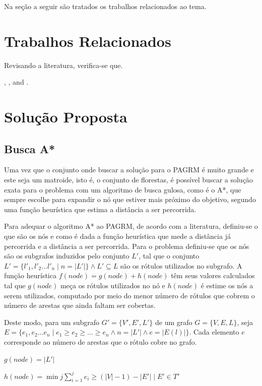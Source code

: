 \documentclass[12pt]{article}
\begin{document}
	Na seção a seguir são tratados os trabalhos relacionados ao tema.

\section{Trabalhos Relacionados}\label{sec:trabalhosRelacionados}

	Revisando a literatura, verifica-se que.

	\cite{knuth:84}, \cite{boulic:91}, and \cite{smith:99}.

\section{Solução Proposta}\label{sec:solucao}

	\subsection{Busca A*}\label{sec:aestrela}

		Uma vez que o conjunto onde buscar a solução para o PAGRM é muito grande e este seja um matroide, isto é, o conjunto de florestas, é possível buscar a solução exata para o problema com um algoritmo de busca gulosa, como é o A*, que sempre escolhe para expandir o nó que estiver mais próximo do objetivo, segundo uma função heurística que estima a distância a ser percorrida.

		Para adequar o algoritmo A* ao PAGRM, de acordo com a literatura, definiu-se o que são os nós e como é dada a função heurística que mede a distância já percorrida e a distância a ser percorrida. Para o problema definiu-se que os nós são os subgrafos induzidos pelo conjunto $L'$, tal que o conjunto $L' = \{l'_1, l'_2 \dots l'_n \mid n = |L'|\} \wedge L' \subseteq L$ são os rótulos utilizados no subgrafo. A função heurística $f(node) = g(node) + h(node)$ têm seus valores calculados tal que $g(node)$ meça os rótulos utilizados no nó e $h(node)$ é estime os nós a serem utilizados, computado por meio do menor número de rótulos que cobrem o número de arestas que ainda faltam ser cobertas.

		Deste modo, para um subgrafo $G' = \{V', E', L'\}$ de um grafo $G = \{V, E, L\}$, seja $E = \{e_1, e_2 \dots e_n \mid e_1 \geq e_2 \geq \dots \geq e_n \wedge n = |L'| \wedge e = |E(l)|\}$. Cada elemento $e$ corresponde ao número de arestas que o rótulo cobre no grafo.

		$g(node) = |L'|$

		$h(node) = \displaystyle{\min j \sum_{i = 1}^{j}{e_i} \geq (|V| - 1) - |E'| \mid E' \in T'}$
\end{document}
